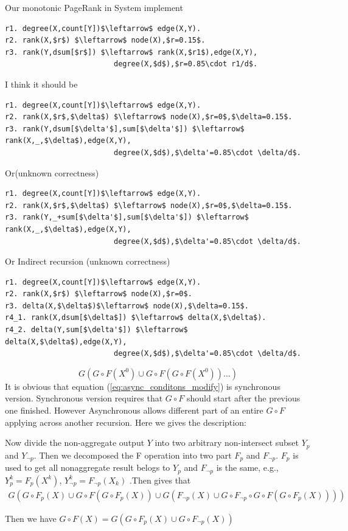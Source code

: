 \begin{appendix}
Our monotonic PageRank in System implement
\begin{lstlisting}
r1. degree(X,count[Y])$\leftarrow$ edge(X,Y).
r2. rank(X,$r$) $\leftarrow$ node(X),$r=0.15$.
r3. rank(Y,dsum[$r$]) $\leftarrow$ rank(X,$r1$),edge(X,Y),
                         degree(X,$d$),$r=0.85\cdot r1/d$.
\end{lstlisting}

I think it should be
\begin{lstlisting}
r1. degree(X,count[Y])$\leftarrow$ edge(X,Y).
r2. rank(X,$r$,$\delta$) $\leftarrow$ node(X),$r=0$,$\delta=0.15$.
r3. rank(Y,dsum[$\delta'$],sum[$\delta'$]) $\leftarrow$ rank(X,_,$\delta$),edge(X,Y),
                         degree(X,$d$),$\delta'=0.85\cdot \delta/d$.
\end{lstlisting}
Or(unknown correctness)
\begin{lstlisting}
r1. degree(X,count[Y])$\leftarrow$ edge(X,Y).
r2. rank(X,$r$,$\delta$) $\leftarrow$ node(X),$r=0$,$\delta=0.15$.
r3. rank(Y,_+sum[$\delta'$],sum[$\delta'$]) $\leftarrow$ rank(X,_,$\delta$),edge(X,Y),
                         degree(X,$d$),$\delta'=0.85\cdot \delta/d$.
\end{lstlisting}
Or Indirect recursion (unknown correctness)
\begin{lstlisting}
r1. degree(X,count[Y])$\leftarrow$ edge(X,Y).
r2. rank(X,$r$) $\leftarrow$ node(X),$r=0$.
r3. delta(X,$\delta$)$\leftarrow$ node(X),$\delta=0.15$.
r4_1. rank(X,dsum[$\delta$]) $\leftarrow$ delta(X,$\delta$).
r4_2. delta(Y,sum[$\delta'$]) $\leftarrow$ delta(X,$\delta$),edge(X,Y),
                         degree(X,$d$),$\delta'=0.85\cdot \delta/d$.
\end{lstlisting}

\onecolumn
\begin{equation}
\label{eq:async_conditons_modify}
G(G\circ F(X^0)\cup G\circ F(G \circ F(X^0))\ldots)
\end{equation}
It is obvious that equation (\ref{eq:async_conditons_modify}) is synchronous version. Synchronous version requires that $G\circ F$ should start after the previous one finished.
However Asynchronous allows different part of an entire $G\circ F$ applying across another recursion.
Here we gives the description:
\begin{definition}
Now divide the non-aggregate output $Y$ into two arbitrary non-intersect subset $Y_p$ and $Y_{\neg p}$. Then we decomposed the F operation into two part $F_p$ and $F_{\neg p}$. $F_p$ is used to get all  nonaggregate result belogs to $Y_{p}$ and $F_{\neg p}$ is the same, e.g., $Y^k_p=F_p(X^k)$, $Y^k_{\neg p}=F_{\neg p}(X_k)$ .Then gives that
\begin{align}
G(G\circ F_p(X)\cup G\circ F(G \circ F_p(X))\cup G(F_{\neg p}(X)\cup G\circ F_{\neg p} \circ G\circ F(G \circ F_{p}(X))) )
\end{align}
\end{definition}
 Then we have $G\circ F(X)= G(G\circ F_p(X) \cup G\circ F_{\neg p}(X))$



\end{appendix}
